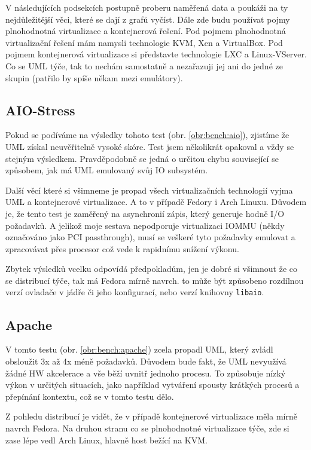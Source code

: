 V následujících podsekcích postupně proberu naměřená data a poukáži na ty nejdůležitější věci, které se dají z grafů vyčíst. Dále zde budu používat pojmy plnohodnotná virtualizace a kontejnerová řešení. Pod pojmem plnohodnotná virtualizační řešení mám namysli technologie KVM, Xen a VirtualBox. Pod pojmem kontejnerová virtualizace si představte technologie LXC a Linux-VServer. Co se UML týče, tak to nechám samostatně a nezařazuji jej ani do jedné ze skupin (patřilo by spíše někam mezi emulátory).

\subsection{AIO-Stress}
Pokud se podíváme na výsledky tohoto test (obr. \ref{obr:bench:aio}), zjistíme že UML získal neuvěřitelně vysoké skóre. Test jsem několikrát opakoval a vždy se stejným výsledkem. Pravděpodobně se jedná o určitou chybu související se způsobem, jak má UML emulovaný svůj IO subsystém.

Další věcí které si všimneme je propad všech virtualizačních technologií vyjma UML a kontejnerové virtualizace. A to v případě Fedory i Arch Linuxu. Důvodem je, že tento test je zaměřený na asynchronií zápis, který generuje hodně I/O požadavků. A jelikož moje sestava nepodporuje virtualizaci IOMMU (někdy označováno jako PCI passthrough), musí se veškeré tyto požadavky emulovat a zpracovávat přes procesor což vede k rapidnímu snížení výkonu.

Zbytek výsledků vcelku odpovídá předpokladům, jen je dobré si všimnout že co se distribucí týče, tak má Fedora mírně navrch. to může být způsobeno rozdílnou verzí ovladače v jádře či jeho konfigurací, nebo verzí knihovny \texttt{libaio}.

\subsection{Apache}
V tomto testu (obr. \ref{obr:bench:apache}) zcela propadl UML, který zvládl obsloužit 3x až 4x méně požadavků. Důvodem bude fakt, že UML nevyužívá žádné HW akcelerace a vše běží uvnitř jednoho procesu. To způsobuje nízký výkon v určitých situacích, jako například vytváření spousty krátkých procesů a přepínání kontextu, což se v tomto testu dělo.

Z pohledu distribucí je vidět, že v případě kontejnerové virtualizace měla mírně navrch Fedora. Na druhou stranu co se plnohodnotné virtualizace týče, zde si zase lépe vedl Arch Linux, hlavně host bežící na 
KVM.

